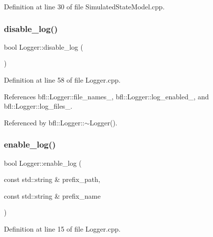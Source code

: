 Definition at line 30 of file Simulated\+State\+Model.\+cpp.

\mbox{\label{classbfl_1_1Logger_a440467a28ccc46490d767fe0ef6f556a}} 
\subsubsection{\texorpdfstring{disable\+\_\+log()}{disable\_log()}}
{\footnotesize\ttfamily bool Logger\+::disable\+\_\+log (\begin{DoxyParamCaption}{ }\end{DoxyParamCaption})\hspace{0.3cm}{\ttfamily [inherited]}}



Definition at line 58 of file Logger.\+cpp.



References bfl\+::\+Logger\+::file\+\_\+names\+\_\+, bfl\+::\+Logger\+::log\+\_\+enabled\+\_\+, and bfl\+::\+Logger\+::log\+\_\+files\+\_\+.



Referenced by bfl\+::\+Logger\+::$\sim$\+Logger().

\mbox{\label{classbfl_1_1Logger_ae94b97b6e8d7902e8ce048384813122e}} 
\subsubsection{\texorpdfstring{enable\+\_\+log()}{enable\_log()}}
{\footnotesize\ttfamily bool Logger\+::enable\+\_\+log (\begin{DoxyParamCaption}\item[{const std\+::string \&}]{prefix\+\_\+path,  }\item[{const std\+::string \&}]{prefix\+\_\+name }\end{DoxyParamCaption})\hspace{0.3cm}{\ttfamily [inherited]}}



Definition at line 15 of file Logger.\+cpp.



